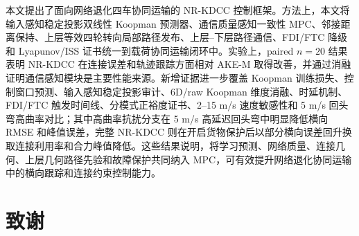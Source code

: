 \documentclass[twocolumn,3p,times,procedia]{elsarticle}
\newcommand{\todozh}[1]{\textcolor{red}{[待补：#1]}}
\newif\ifNRReview
\renewcommand{\todozh}[1]{\ifNRReview\textcolor{red}{[待补：#1]}\fi}
\newcommand{\AKE}{AKE-M}
\newcommand{\Method}{NR-KDCC}
\begin{document}
本文提出了面向网络退化四车协同运输的 \Method{} 控制框架。方法上，本文将输入感知稳定投影双线性 Koopman 预测器、通信质量感知一致性 MPC、邻接距离保持、上层等效四轮转向局部路径发布、上层--下层路径通信、FDI/FTC 降级和 Lyapunov/ISS 证书统一到载荷协同运输闭环中。实验上，paired $n=20$ 结果表明 \Method{} 在连接误差和轨迹跟踪方面相对 \AKE{} 取得改善，并通过消融证明通信感知模块是主要性能来源。新增证据进一步覆盖 Koopman 训练损失、控制窗口预测、输入感知稳定投影审计、6D/raw Koopman 维度消融、时延机制、FDI/FTC 触发时间线、分模式正裕度证书、2--15 m/s 速度敏感性和 5 m/s 回头弯高曲率对比；其中高曲率抗扰分支在 5 m/s 高延迟回头弯中明显降低横向 RMSE 和峰值误差，完整 \Method{} 则在开启货物保护后以部分横向误差回升换取连接利用率和合力峰值降低。这些结果说明，将学习预测、网络质量、连接几何、上层几何路径先验和故障保护共同纳入 MPC，可有效提升网络退化协同运输中的横向跟踪和连接约束控制能力。

\section*{致谢}

\todozh{补充基金项目、课题编号和作者贡献声明。}

\FloatBarrier
\balance


\end{document}

